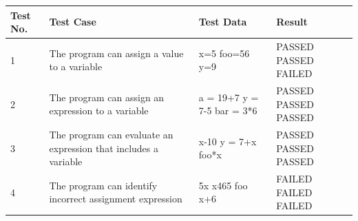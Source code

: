 \documentclass[a4paper, oneside, 11pt]{report}
\begin{document}
\begin{tabular}{|p{8mm}|p{60mm}|p{30mm}|p{15mm}|}Test No. & Test Case & Test Data & Result \\ \hline
1 & The program can assign a value to a variable & x=5 \newline foo=56 \newline y=9  &  PASSED \newline PASSED \newline FAILED \\
2 & The program can assign an expression to a variable & a = 19+7 \newline y = 7-5 \newline bar = 3*6  &  PASSED \newline PASSED \newline PASSED \\
3 & The program can evaluate an expression that includes a variable & x-10 \newline y = 7+x \newline foo*x  &  PASSED \newline PASSED \newline PASSED \\
4 & The program can identify incorrect assignment expression & 5x \newline x465 \newline foo x+6  &  FAILED \newline FAILED \newline FAILED \\
\end{tabular}
\end{document}

